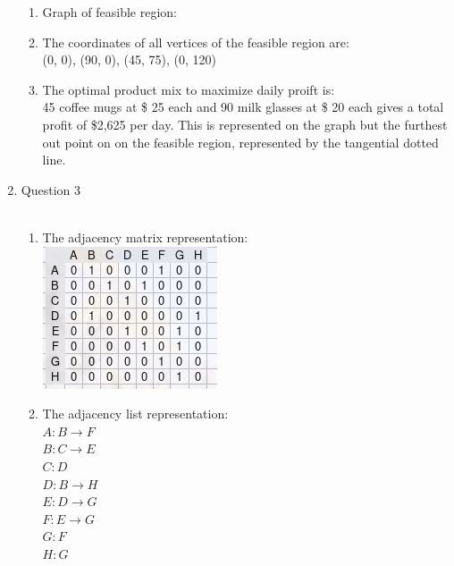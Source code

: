 \documentclass{article}
\begin{document}
\begin{enumerate}
\begin{enumerate}
        \item Graph of feasible region:



        \item The coordinates of all vertices of the feasible region are:\\
          (0, 0), (90, 0), (45, 75), (0, 120)

        \item The optimal product mix to maximize daily proift is:\\
          45 coffee mugs at \$ 25 each and 90 milk glasses at \$ 20 each 
          gives a total profit of \$2,625 per day.
          This is represented on the graph but the furthest out point on on the 
          feasible region, represented by the tangential dotted line.




      \end{enumerate}

\item Question 3\\\\
  \begin{enumerate}
  \item The adjacency matrix representation:\\
  \includegraphics[scale=1]{adjmatrix.png}
  
  \item The adjacency list representation:\\
    $A: B \to F$\\
    $B: C \to E$\\
    $C: D$\\
    $D: B \to H$\\
    $E: D \to G$\\
    $F: E \to G$\\
    $G: F$\\
    $H: G$
    

\end{enumerate}
\end{enumerate}
\end{document}
